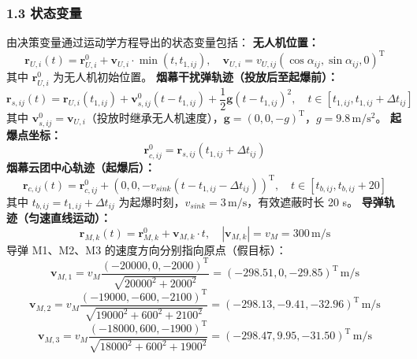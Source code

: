 \documentclass{JXUSTmodeling}
\begin{document}
\subsubsection{1.3 状态变量}
由决策变量通过运动学方程导出的状态变量包括：
\textbf{无人机位置：}
\begin{equation}
\mathbf{r}_{U,i}(t)=\mathbf{r}_{U,i}^0+\mathbf{v}_{U,i}\cdot\min(t,t_{1,ij}),\quad \mathbf{v}_{U,i}=v_{U,ij}(\cos\alpha_{ij},\sin\alpha_{ij},0)^{\mathrm{T}} \tag{1.3}
\end{equation}
其中 $\mathbf{r}_{U,i}^0$ 为无人机初始位置。
\textbf{烟幕干扰弹轨迹（投放后至起爆前）：}
\begin{equation}
\mathbf{r}_{s,ij}(t)=\mathbf{r}_{U,i}(t_{1,ij})+\mathbf{v}_{s,ij}^0(t-t_{1,ij})+\frac{1}{2}\mathbf{g}(t-t_{1,ij})^2,\quad t\in[t_{1,ij},t_{1,ij}+\Delta t_{ij}] \tag{1.4}
\end{equation}
其中 $\mathbf{v}_{s,ij}^0=\mathbf{v}_{U,i}$（投放时继承无人机速度），$\mathbf{g}=(0,0,-g)^{\mathrm{T}}$，$g=9.8\,\mathrm{m/s^2}$。
\textbf{起爆点坐标：}
\begin{equation}
\mathbf{r}_{c,ij}^0=\mathbf{r}_{s,ij}(t_{1,ij}+\Delta t_{ij}) \tag{1.5}
\end{equation}
\textbf{烟幕云团中心轨迹（起爆后）：}
\begin{equation}
\mathbf{r}_{c,ij}(t)=\mathbf{r}_{c,ij}^0+(0,0,-v_{sink}(t-t_{1,ij}-\Delta t_{ij}))^{\mathrm{T}},\quad t\in[t_{b,ij},t_{b,ij}+20] \tag{1.6}
\end{equation}
其中 $t_{b,ij}=t_{1,ij}+\Delta t_{ij}$ 为起爆时刻，$v_{sink}=3\,\mathrm{m/s}$，有效遮蔽时长 20 s。
\textbf{导弹轨迹（匀速直线运动）：}
\begin{equation}
\mathbf{r}_{M,k}(t)=\mathbf{r}_{M,k}^0+\mathbf{v}_{M,k}\cdot t,\quad |\mathbf{v}_{M,k}|=v_M=300\,\mathrm{m/s} \tag{1.7}
\end{equation}
导弹 M1、M2、M3 的速度方向分别指向原点（假目标）：
\begin{equation}
\mathbf{v}_{M,1}=v_M\frac{(-20000,0,-2000)^{\mathrm{T}}}{\sqrt{20000^2+2000^2}}=(-298.51,0,-29.85)^{\mathrm{T}}\,\mathrm{m/s} \tag{1.8}
\end{equation}
\begin{equation}
\mathbf{v}_{M,2}=v_M\frac{(-19000,-600,-2100)^{\mathrm{T}}}{\sqrt{19000^2+600^2+2100^2}}=(-298.13,-9.41,-32.96)^{\mathrm{T}}\,\mathrm{m/s} \tag{1.9}
\end{equation}
\begin{equation}
\mathbf{v}_{M,3}=v_M\frac{(-18000,600,-1900)^{\mathrm{T}}}{\sqrt{18000^2+600^2+1900^2}}=(-298.47,9.95,-31.50)^{\mathrm{T}}\,\mathrm{m/s} \tag{1.10}
\end{equation}
\end{document}
